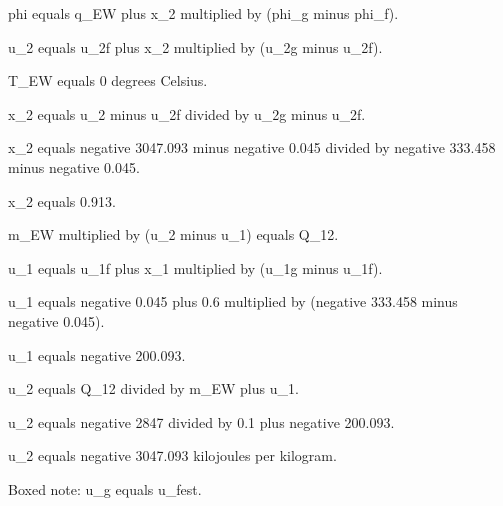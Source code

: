 phi equals q_EW plus x_2 multiplied by (phi_g minus phi_f).  

u_2 equals u_2f plus x_2 multiplied by (u_2g minus u_2f).  

T_EW equals 0 degrees Celsius.  

x_2 equals u_2 minus u_2f divided by u_2g minus u_2f.  

x_2 equals negative 3047.093 minus negative 0.045 divided by negative 333.458 minus negative 0.045.  

x_2 equals 0.913.  

m_EW multiplied by (u_2 minus u_1) equals Q_12.  

u_1 equals u_1f plus x_1 multiplied by (u_1g minus u_1f).  

u_1 equals negative 0.045 plus 0.6 multiplied by (negative 333.458 minus negative 0.045).  

u_1 equals negative 200.093.  

u_2 equals Q_12 divided by m_EW plus u_1.  

u_2 equals negative 2847 divided by 0.1 plus negative 200.093.  

u_2 equals negative 3047.093 kilojoules per kilogram.  

Boxed note: u_g equals u_fest.